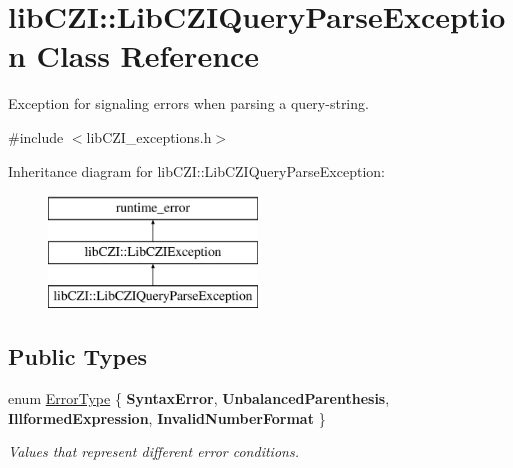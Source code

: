 \hypertarget{classlib_c_z_i_1_1_lib_c_z_i_query_parse_exception}{}\section{lib\+C\+ZI\+:\+:Lib\+C\+Z\+I\+Query\+Parse\+Exception Class Reference}
\label{classlib_c_z_i_1_1_lib_c_z_i_query_parse_exception}


Exception for signaling errors when parsing a query-\/string.  




{\ttfamily \#include $<$lib\+C\+Z\+I\+\_\+exceptions.\+h$>$}

Inheritance diagram for lib\+C\+ZI\+:\+:Lib\+C\+Z\+I\+Query\+Parse\+Exception\+:\begin{figure}[H]
\begin{center}
\leavevmode
\includegraphics[height=3.000000cm]{classlib_c_z_i_1_1_lib_c_z_i_query_parse_exception}
\end{center}
\end{figure}
\subsection*{Public Types}
\begin{DoxyCompactItemize}
\item 
\mbox{\label{classlib_c_z_i_1_1_lib_c_z_i_query_parse_exception_adf5a11c2415ec7c92d95365fa5af2fde}} 
enum \hyperlink{classlib_c_z_i_1_1_lib_c_z_i_query_parse_exception_adf5a11c2415ec7c92d95365fa5af2fde}{Error\+Type} \{ {\bfseries Syntax\+Error}, 
{\bfseries Unbalanced\+Parenthesis}, 
{\bfseries Illformed\+Expression}, 
{\bfseries Invalid\+Number\+Format}
 \}\begin{DoxyCompactList}\small\item\em Values that represent different error conditions. \end{DoxyCompactList}
\end{DoxyCompactItemize}

